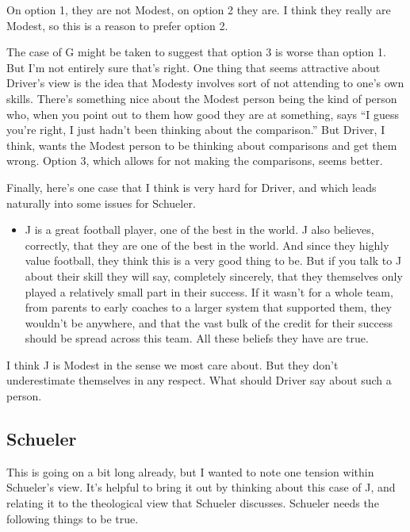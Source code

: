 \documentclass[
]{article}
\providecommand{\tightlist}{%
  \setlength{\itemsep}{0pt}\setlength{\parskip}{0pt}}
\begin{document}
On option 1, they are not Modest, on option 2 they are. I think they
really are Modest, so this is a reason to prefer option 2.

The case of G might be taken to suggest that option 3 is worse than
option 1. But I'm not entirely sure that's right. One thing that seems
attractive about Driver's view is the idea that Modesty involves sort of
not attending to one's own skills. There's something nice about the
Modest person being the kind of person who, when you point out to them
how good they are at something, says ``I guess you're right, I just
hadn't been thinking about the comparison.'' But Driver, I think, wants
the Modest person to be thinking about comparisons and get them wrong.
Option 3, which allows for not making the comparisons, seems better.

Finally, here's one case that I think is very hard for Driver, and which
leads naturally into some issues for Schueler.

\begin{itemize}
\tightlist
\item
  J is a great football player, one of the best in the world. J also
  believes, correctly, that they are one of the best in the world. And
  since they highly value football, they think this is a very good thing
  to be. But if you talk to J about their skill they will say,
  completely sincerely, that they themselves only played a relatively
  small part in their success. If it wasn't for a whole team, from
  parents to early coaches to a larger system that supported them, they
  wouldn't be anywhere, and that the vast bulk of the credit for their
  success should be spread across this team. All these beliefs they have
  are true.
\end{itemize}

I think J is Modest in the sense we most care about. But they don't
underestimate themselves in any respect. What should Driver say about
such a person.

\hypertarget{schueler}{%
\subsection{Schueler}\label{schueler}}

This is going on a bit long already, but I wanted to note one tension
within Schueler's view. It's helpful to bring it out by thinking about
this case of J, and relating it to the theological view that Schueler
discusses. Schueler needs the following things to be true.
\end{document}
